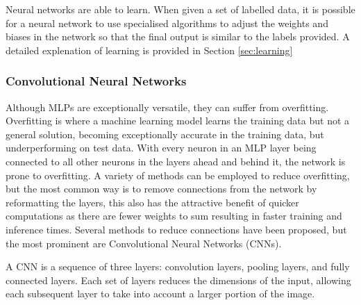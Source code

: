 Neural networks are able to learn. When given a set of labelled data, it is possible for a neural network to use specialised algorithms to adjust the weights and biases in the network so that the final output is similar to the labels provided. A detailed explenation of learning is provided in Section \ref{sec:learning}

\subsubsection{Convolutional Neural Networks}
\label{sec:cnns}

Although MLPs are exceptionally versatile, they can suffer from overfitting. Overfitting is where a machine learning model learns the training data but not a general solution, becoming exceptionally accurate in the training data, but underperforming on test data. With every neuron in an MLP layer being connected to all other neurons in the layers ahead and behind it, the network is prone to overfitting\cite{o2015introduction}. A variety of methods can be employed to reduce overfitting, but the most common way is to remove connections from the network by reformatting the layers, this also has the attractive benefit of quicker computations as there are fewer weights to sum resulting in faster training and inference times. Several methods to reduce connections have been proposed, but the most prominent are Convolutional Neural Networks (CNNs).

A CNN is a sequence of three layers: convolution layers, pooling layers, and fully connected layers\cite{ibmconvolutional}. Each set of layers reduces the dimensions of the input, allowing each subsequent layer to take into account a larger portion of the image.

